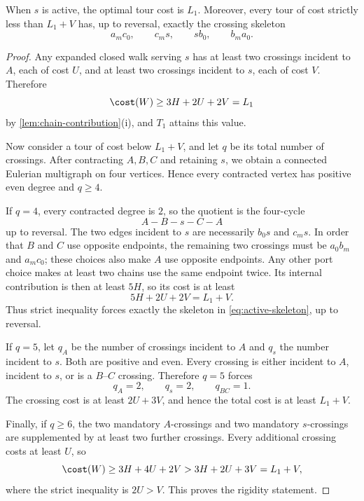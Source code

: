 \begin{lemma}\label{lem:active-rigidity}
When $s$ is active, the optimal tour cost is $L_1$.  Moreover, every tour of
cost strictly less than $L_1+V$ has, up to reversal, exactly the crossing
skeleton
\begin{equation}\label{eq:active-skeleton}
  a_mc_0,
  \qquad
  c_ms,
  \qquad
  sb_0,
  \qquad
  b_ma_0.
\end{equation}
\end{lemma}

\begin{proof}
Any expanded closed walk serving $s$ has at least two crossings incident to
$A$, each of cost $U$, and at least two crossings incident to $s$, each of cost
$V$.  Therefore
\[
  \cost(W)\ge3H+2U+2V=L_1
\]
by \cref{lem:chain-contribution}(i), and $T_1$ attains this value.

Now consider a tour of cost below $L_1+V$, and let $q$ be its total number of
crossings.  After contracting $A,B,C$ and retaining $s$, we obtain a connected
Eulerian multigraph on four vertices.  Hence every contracted vertex has
positive even degree and $q\ge4$.

If $q=4$, every contracted degree is $2$, so the quotient is the four-cycle
\[
  A-B-s-C-A
\]
up to reversal.  The two edges incident to $s$ are necessarily $b_0s$ and
$c_ms$.  In order that $B$ and $C$ use opposite endpoints, the remaining two
crossings must be $a_0b_m$ and $a_mc_0$; these choices also make $A$ use
opposite endpoints.  Any other port choice makes at least two chains use the
same endpoint twice.  Its internal contribution is then at least $5H$, so its
cost is at least
\[
  5H+2U+2V=L_1+V.
\]
Thus strict inequality forces exactly the skeleton in
\cref{eq:active-skeleton}, up to reversal.

If $q=5$, let $q_A$ be the number of crossings incident to $A$ and $q_s$ the
number incident to $s$.  Both are positive and even.  Every crossing is either
incident to $A$, incident to $s$, or is a $B$--$C$ crossing.  Therefore
$q=5$ forces
\[
  q_A=2,
  \qquad
  q_s=2,
  \qquad
  q_{BC}=1.
\]
The crossing cost is at least $2U+3V$, and hence the total cost is at least
$L_1+V$.

Finally, if $q\ge6$, the two mandatory $A$-crossings and two mandatory
$s$-crossings are supplemented by at least two further crossings.  Every
additional crossing costs at least $U$, so
\[
  \cost(W)
  \ge3H+4U+2V
  >3H+2U+3V
  =L_1+V,
\]
where the strict inequality is $2U>V$.  This proves the rigidity statement.
\end{proof}

